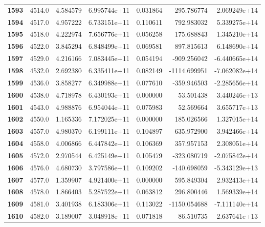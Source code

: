 \documentclass{report}[12pt]
\begin{document}
\begin{center}
\begin{tabular}{lrrrrrr}
\textbf{1593} &         4514.0 &   4.584579 &  6.995744e+11 &    0.031864 &  -295.786774 & -2.069249e+14 \\
\textbf{1594} &         4517.0 &   4.957222 &  6.733151e+11 &    0.110611 &   792.983032 &  5.339275e+14 \\
\textbf{1595} &         4518.0 &   4.222974 &  7.656776e+11 &    0.056258 &   175.688843 &  1.345210e+14 \\
\textbf{1596} &         4522.0 &   3.845294 &  6.848499e+11 &    0.069581 &   897.815613 &  6.148690e+14 \\
\textbf{1597} &         4529.0 &   4.216166 &  7.083445e+11 &    0.054194 &  -909.256042 & -6.440665e+14 \\
\textbf{1598} &         4532.0 &   2.692380 &  6.335411e+11 &    0.082149 & -1114.699951 & -7.062082e+14 \\
\textbf{1599} &         4536.0 &   3.858277 &  6.349988e+11 &    0.077610 &  -359.946503 & -2.285656e+14 \\
\textbf{1600} &         4538.0 &   4.718978 &  6.430193e+11 &    0.000000 &    53.501438 &  3.440246e+13 \\
\textbf{1601} &         4543.0 &   4.988876 &  6.954044e+11 &    0.075983 &    52.569664 &  3.655717e+13 \\
\textbf{1602} &         4550.0 &   1.165336 &  7.172025e+11 &    0.000000 &   185.026566 &  1.327015e+14 \\
\textbf{1603} &         4557.0 &   4.980370 &  6.199111e+11 &    0.104897 &   635.972900 &  3.942466e+14 \\
\textbf{1604} &         4558.0 &   4.006866 &  6.447842e+11 &    0.106369 &   357.957153 &  2.308051e+14 \\
\textbf{1605} &         4572.0 &   2.970544 &  6.425149e+11 &    0.105479 &  -323.080719 & -2.075842e+14 \\
\textbf{1606} &         4576.0 &   4.680730 &  3.797586e+11 &    0.109202 &  -140.698059 & -5.343129e+13 \\
\textbf{1607} &         4577.0 &   1.359907 &  4.921400e+11 &    0.000000 &   595.849304 &  2.932413e+14 \\
\textbf{1608} &         4578.0 &   1.866403 &  5.287522e+11 &    0.063812 &   296.800446 &  1.569339e+14 \\
\textbf{1609} &         4581.0 &   3.401938 &  6.183306e+11 &    0.113022 & -1150.054688 & -7.111140e+14 \\
\textbf{1610} &         4582.0 &   3.189007 &  3.048918e+11 &    0.071818 &    86.510735 &  2.637641e+13 \\

\end{tabular}
\end{center}
\end{document}
